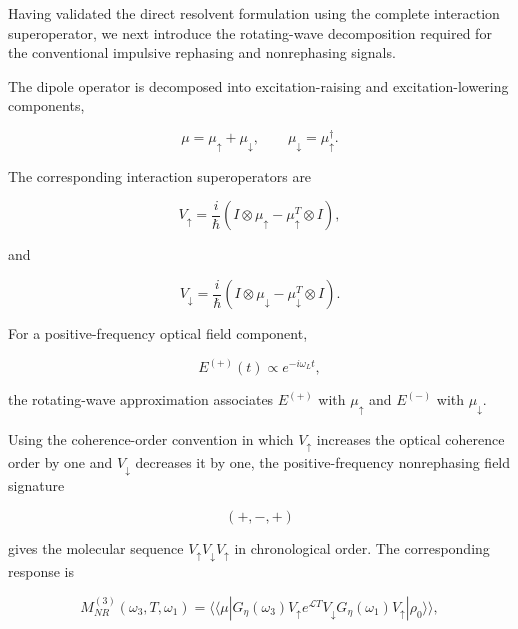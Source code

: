 \documentclass[11pt]{article}
\begin{document}
Having validated the direct resolvent formulation using the complete
interaction superoperator, we next introduce the rotating-wave
decomposition required for the conventional impulsive rephasing and
nonrephasing signals.

The dipole operator is decomposed into excitation-raising and
excitation-lowering components,

\begin{equation}
\mu
=
\mu_{\uparrow}
+
\mu_{\downarrow},
\qquad
\mu_{\downarrow}
=
\mu_{\uparrow}^{\dagger}.
\end{equation}

The corresponding interaction superoperators are

\begin{equation}
V_{\uparrow}
=
\frac{i}{\hbar}
\left(
I\otimes\mu_{\uparrow}
-
\mu_{\uparrow}^{T}\otimes I
\right),
\end{equation}

and

\begin{equation}
V_{\downarrow}
=
\frac{i}{\hbar}
\left(
I\otimes\mu_{\downarrow}
-
\mu_{\downarrow}^{T}\otimes I
\right).
\end{equation}

For a positive-frequency optical field component,

\begin{equation}
E^{(+)}(t)
\propto
e^{-i\omega_L t},
\end{equation}

the rotating-wave approximation associates $E^{(+)}$ with
$\mu_{\uparrow}$ and $E^{(-)}$ with $\mu_{\downarrow}$.

Using the coherence-order convention in which $V_{\uparrow}$ increases
the optical coherence order by one and $V_{\downarrow}$ decreases it
by one, the positive-frequency nonrephasing field signature

\begin{equation}
(+,-,+)
\end{equation}

gives the molecular sequence
$V_{\uparrow}V_{\downarrow}V_{\uparrow}$ in chronological order.
The corresponding response is

\begin{equation}
M_{NR}^{(3)}
(\omega_3,T,\omega_1)
=
\langle\!\langle\mu|
G_\eta(\omega_3)
V_{\uparrow}
e^{\mathcal{L}T}
V_{\downarrow}
G_\eta(\omega_1)
V_{\uparrow}
|\rho_0\rangle\!\rangle ,
\label{eq:M3_NR}
\end{equation}
\end{document}
